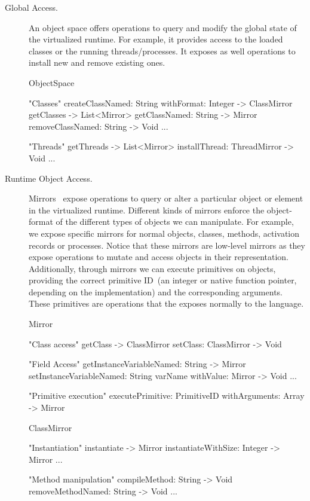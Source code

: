 \begin{description}
\item[Global Access.] An object space offers operations to query and modify the global state of the virtualized runtime. For example, it provides access to the loaded classes or the running threads/processes. It exposes as well operations to install new and remove existing ones.

\begin{code}
ObjectSpace {
    "Classes"
    createClassNamed: String withFormat: Integer -> ClassMirror
    getClasses -> List<Mirror>
    getClassNamed: String -> Mirror
    removeClassNamed: String -> Void
    ...

    "Threads"
    getThreads -> List<Mirror>
    installThread: ThreadMirror -> Void
    ...
}
\end{code}

\item[Runtime Object Access.] Mirrors~\cite{Brac04b} expose operations to query or alter a particular object or element in the virtualized runtime. Different kinds of mirrors enforce the object-format of the different types of objects we can manipulate. For example, we expose specific mirrors for normal objects, classes, methods, activation records or processes. Notice that these mirrors are low-level mirrors as they expose operations to mutate and access objects in their \VM representation. Additionally, through mirrors we can execute \VM primitives on objects, providing the correct primitive ID~(an integer or native function pointer, depending on the implementation) and the corresponding arguments. These primitives are operations that the \VM exposes normally to the language.

\begin{code}
Mirror {
    "Class access"
    getClass -> ClassMirror
    setClass: ClassMirror -> Void

    "Field Access"
    getInstanceVariableNamed: String -> Mirror
    setInstanceVariableNamed: String varName withValue: Mirror -> Void
    ...
    
    "Primitive execution"
    executePrimitive: PrimitiveID withArguments: Array -> Mirror
}
\end{code}

\begin{code}
ClassMirror {
    "Instantiation"
    instantiate -> Mirror
    instantiateWithSize: Integer -> Mirror
    ...

    "Method manipulation"    
    compileMethod: String -> Void
    removeMethodNamed: String -> Void
    ...
}
\end{code}

\end{description}

